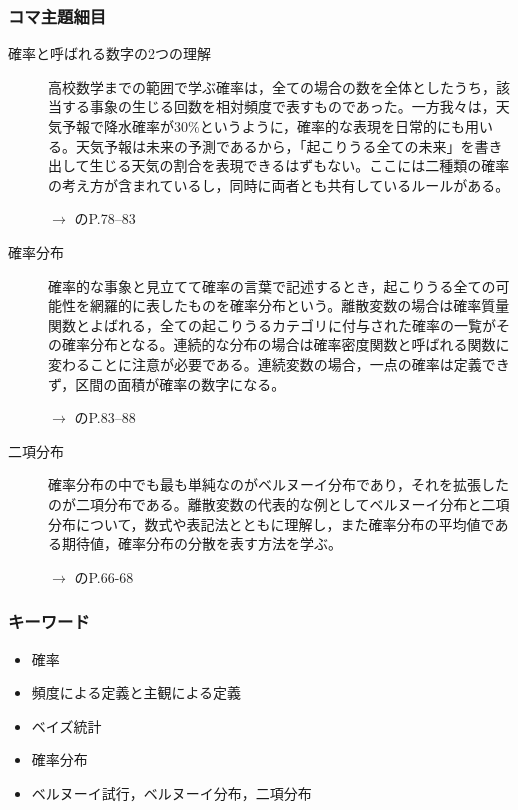 \subsubsection{コマ主題細目}
\begin{description}

\item[確率と呼ばれる数字の2つの理解]高校数学までの範囲で学ぶ確率は，全ての場合の数を全体としたうち，該当する事象の生じる回数を相対頻度で表すものであった。一方我々は，天気予報で降水確率が30\%というように，確率的な表現を日常的にも用いる。天気予報は未来の予測であるから，「起こりうる全ての未来」を書き出して生じる天気の割合を表現できるはずもない。ここには二種類の確率の考え方が含まれているし，同時に両者とも共有しているルールがある。
\begin{flushright}
    $\to$ \citet{Maeda2017}のP.78--83
\end{flushright}

\item[確率分布]確率的な事象と見立てて確率の言葉で記述するとき，起こりうる全ての可能性を網羅的に表したものを確率分布という。離散変数の場合は確率質量関数とよばれる，全ての起こりうるカテゴリに付与された確率の一覧がその確率分布となる。連続的な分布の場合は確率密度関数と呼ばれる関数に変わることに注意が必要である。連続変数の場合，一点の確率は定義できず，区間の面積が確率の数字になる。
\begin{flushright}
    $\to$ \citet{Maeda2017}のP.83--88
\end{flushright}

\item[二項分布]確率分布の中でも最も単純なのがベルヌーイ分布であり，それを拡張したのが二項分布である。離散変数の代表的な例としてベルヌーイ分布と二項分布について，数式や表記法とともに理解し，また確率分布の平均値である期待値，確率分布の分散を表す方法を学ぶ。
\begin{flushright}
    $\to$ \citet{野島201903}のP.66-68
\end{flushright}

\end{description}
\subsubsection{キーワード}
\begin{itemize}
\item 確率
\item 頻度による定義と主観による定義
\item ベイズ統計
\item 確率分布
\item ベルヌーイ試行，ベルヌーイ分布，二項分布
\end{itemize}
